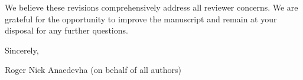 \documentclass[12pt,a4paper]{article}
\begin{document}
\vspace{1em}
\noindent We believe these revisions comprehensively address all reviewer concerns. We are grateful for the opportunity to improve the manuscript and remain at your disposal for any further questions.

\vspace{1em}
\noindent Sincerely,

\vspace{0.5em}
\noindent Roger Nick Anaedevha (on behalf of all authors)
\end{document}
